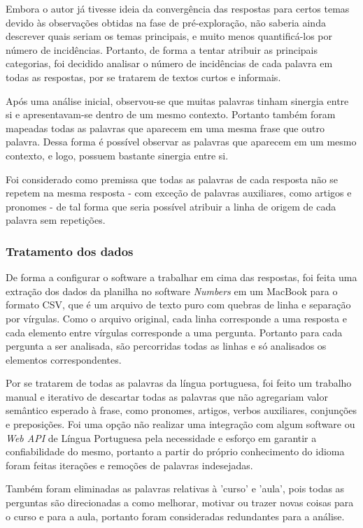 Embora o autor já tivesse ideia da convergência das respostas para certos temas devido às observações obtidas na fase de pré-exploração, não saberia ainda descrever quais seriam os temas principais, e muito menos quantificá-los por número de incidências. Portanto, de forma a tentar atribuir as principais categorias, foi decidido analisar o número de incidências de cada palavra em todas as respostas, por se tratarem de textos curtos e informais.

Após uma análise inicial, observou-se que muitas palavras tinham sinergia entre si e apresentavam-se dentro de um mesmo contexto. Portanto também foram mapeadas todas as palavras que aparecem em uma mesma frase que outro palavra. Dessa forma é possível observar as palavras que aparecem em um mesmo contexto, e logo, possuem bastante sinergia entre si.

Foi considerado como premissa que todas as palavras de cada resposta não se repetem na mesma resposta - com exceção de palavras auxiliares, como artigos e pronomes - de tal forma que seria possível atribuir a linha de origem de cada palavra sem repetições.

\subsubsection*{Tratamento dos dados}

De forma a configurar o software a trabalhar em cima das respostas, foi feita uma extração dos dados da planilha no software \textit{Numbers} em um MacBook para o formato CSV, que é um arquivo de texto puro com quebras de linha e separação por vírgulas. Como o arquivo original, cada linha corresponde a uma resposta e cada elemento entre vírgulas corresponde a uma pergunta. Portanto para cada pergunta a ser analisada, são percorridas todas as linhas e só analisados os elementos correspondentes.

Por se tratarem de todas as palavras da língua portuguesa, foi feito um trabalho manual e iterativo de descartar todas as palavras que não agregariam valor semântico esperado à frase, como pronomes, artigos, verbos auxiliares, conjunções e preposições. Foi uma opção não realizar uma integração com algum software ou \textit{Web API} de Língua Portuguesa pela necessidade e esforço em garantir a confiabilidade do mesmo, portanto a partir do próprio conhecimento do idioma foram feitas iterações e remoções de palavras indesejadas.

Também foram eliminadas as palavras relativas à 'curso' e 'aula', pois todas as perguntas são direcionadas a como melhorar, motivar ou trazer novas coisas para o curso e para a aula, portanto foram consideradas redundantes para a análise.

